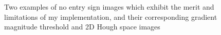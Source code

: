 \documentclass[onecolumn, 10pt, a4paper]{article}
\begin{document}
\begin{figure}[H]
  \hfill
  \caption{Two examples of no entry sign images which exhibit the merit and limitations of my implementation, and their corresponding gradient magnitude threshold and 2D Hough space images}\label{fig:hough_details}
\end{figure}
\end{document}
